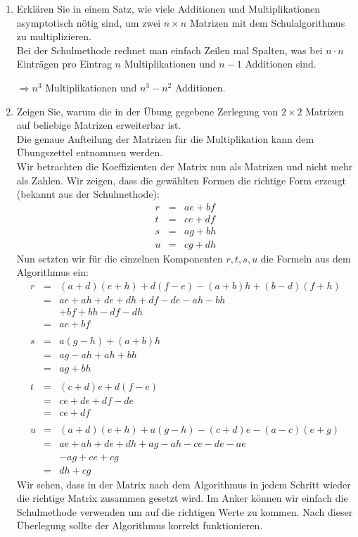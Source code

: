 \documentclass[11pt,a4paper,ngerman]{article}
\begin{document}
\begin{enumerate}[\bfseries (a)]

\item Erklären Sie in einem Satz, wie viele Additionen und Multiplikationen asymptotisch nötig sind, um zwei $n \times n$ Matrizen mit dem Schulalgorithmus zu multiplizieren.\\

Bei der Schulmethode rechnet man einfach Zeilen mal Spalten, was bei $n \cdot n$ Einträgen pro Eintrag $n$ Multiplikationen und $n-1$ Additionen sind.

$\Rightarrow n^3$ Multiplikationen und $n^3 - n^2$ Additionen.

\item Zeigen Sie, warum die in der Übung gegebene Zerlegung von $2\times2$ Matrizen auf beliebige Matrizen erweiterbar ist.\\
Die genaue Aufteilung der Matrizen für die Multiplikation kann dem Übungszettel entnommen werden.\\

Wir betrachten die Koeffizienten der Matrix nun als Matrizen und nicht mehr als Zahlen. Wir zeigen, dass die gewählten Formen die richtige Form erzeugt (bekannt aus der Schulmethode):
$$
\begin{array}{rcl}
r &=& ae + bf\\
t &=& ce + df\\
s &=& ag + bh\\
u &=& cg + dh
\end{array}
$$
Nun setzten wir für die einzelnen Komponenten $r,t,s,u$ die Formeln aus dem Algorithmus ein:
$$
\begin{array}{rcl}
r &=& (a+d)(e+h) + d(f-e) - (a+b)h + (b-d)(f+h)\\
&=& ae + ah + de + dh + df - de - ah - bh\\
&& + bf + bh -df -dh\\
&=& ae + bf\\
&&\\
s &=& a (g - h) + (a+b)h\\
&=& ag - ah + ah + bh\\
&=& ag + bh\\
&&\\
t &=& (c+d)e + d(f-e)\\
&=& ce + de + df - de\\
&=& ce + df\\
&&\\
u &=& (a+d)(e+h)+a(g-h) - (c+d) e - (a-c)(e+g)\\
&=& ae + ah + de + dh + ag - ah - ce - de -ae\\
&& -ag +ce + cg\\
&=& dh + cg
\end{array}
$$
Wir sehen, dass in der Matrix nach dem Algorithmus in jedem Schritt wieder die richtige Matrix zusammen gesetzt wird. Im Anker können wir einfach die Schulmethode verwenden um auf die richtigen Werte zu kommen. Nach dieser Überlegung sollte der Algorithmus korrekt funktionieren.


\end{enumerate}
\end{document}
